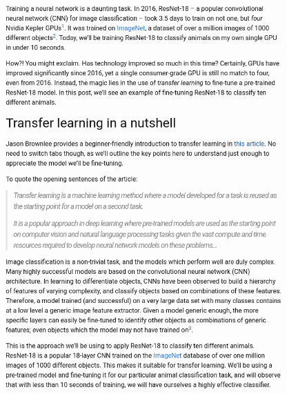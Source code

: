 \begin{figure}[!ht]
    \centering
    \includegraphics[width=\textwidth]{images/q1_sample_of_post_3.png}
\end{figure}
